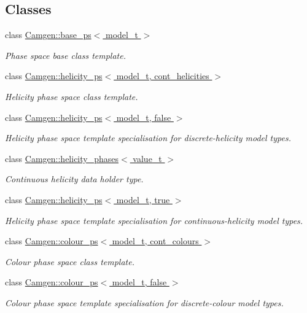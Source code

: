 \subsection*{Classes}
\begin{DoxyCompactItemize}
\item 
class \hyperlink{a00026}{Camgen\-::base\-\_\-ps$<$ model\-\_\-t $>$}
\begin{DoxyCompactList}\small\item\em Phase space base class template. \end{DoxyCompactList}\item 
class \hyperlink{a00272}{Camgen\-::helicity\-\_\-ps$<$ model\-\_\-t, cont\-\_\-helicities $>$}
\begin{DoxyCompactList}\small\item\em Helicity phase space class template. \end{DoxyCompactList}\item 
class \hyperlink{a00273}{Camgen\-::helicity\-\_\-ps$<$ model\-\_\-t, false $>$}
\begin{DoxyCompactList}\small\item\em Helicity phase space template specialisation for discrete-\/helicity model types. \end{DoxyCompactList}\item 
class \hyperlink{a00271}{Camgen\-::helicity\-\_\-phases$<$ value\-\_\-t $>$}
\begin{DoxyCompactList}\small\item\em Continuous helicity data holder type. \end{DoxyCompactList}\item 
class \hyperlink{a00274}{Camgen\-::helicity\-\_\-ps$<$ model\-\_\-t, true $>$}
\begin{DoxyCompactList}\small\item\em Helicity phase space template specialisation for continuous-\/helicity model types. \end{DoxyCompactList}\item 
class \hyperlink{a00089}{Camgen\-::colour\-\_\-ps$<$ model\-\_\-t, cont\-\_\-colours $>$}
\begin{DoxyCompactList}\small\item\em Colour phase space class template. \end{DoxyCompactList}\item 
class \hyperlink{a00090}{Camgen\-::colour\-\_\-ps$<$ model\-\_\-t, false $>$}
\begin{DoxyCompactList}\small\item\em Colour phase space template specialisation for discrete-\/colour model types. \end{DoxyCompactList}\item 

\end{DoxyCompactItemize}
